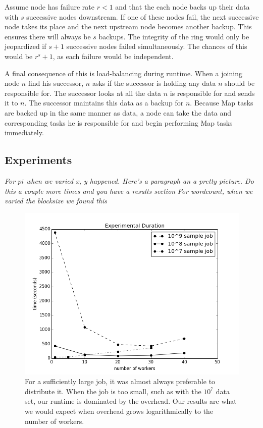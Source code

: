 Assume node has failure rate $r < 1$ and that the each node backs up their data with $s$ successive nodes downstream. 
If one of these nodes fail, the next successive node takes its place and the next upstream node becomes another backup. 
This ensures there will always be $s$ backups. 
The integrity of the ring would only be jeopardized if $s+1$ successive nodes failed simultaneously.
The chances of this would be $r^s+1$, as each failure would be independent.


A final consequence of this is load-balancing during runtime.  
When a joining node $n$ find his successor, $n$ asks if the successor is holding any data $n$ should be responsible for.  
The successor looks at all the data $n$ is responsible for and sends it to $n$.  
The successor maintains this data as a backup for $n$.  
Because Map tasks are backed up in the same manner as data, a node can take the data and corresponding tasks he is responsible for and begin performing Map tasks immediately.

\subsection{Experiments}

\textit{For $pi$  when we varied x, y happened.  Here's a paragraph an a pretty picture.  Do this a couple more times and you have a results section }\textit{For wordcount, when we varied the blocksize we found this}


\begin{figure}
	\includegraphics[width=\linewidth]{figs/expTime}
	\caption{For a sufficiently large job, it was almost always preferable to distribute it.  When the job is too small, such as with the $10^{7}$ data set, our runtime is dominated by the overhead.  Our results are what we would expect when overhead grows logarithmically to the number of workers.}
	\label{fig:expTime}
\end{figure}


